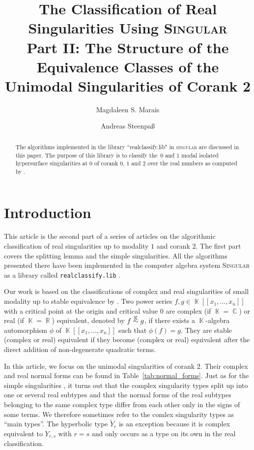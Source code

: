 \documentclass[noend]{amsproc}
\title[The Classification of Real Singularities Using \textsc{Singular}, %
Part II]%
{The Classification of Real Singularities Using \textsc{Singular}\\
Part II: The Structure of the Equivalence Classes of the Unimodal %
Singularities of Corank 2}
\author{Magdaleen S. Marais}
\author{Andreas Steenpa\ss}
\theoremstyle{definition}
\newcommand{\Singular}{\textsc{Singular}}
\newcommand{\realclassify}{\texttt{realclassify.lib}}
\newcommand{\tY}{\widetilde{Y}}
\DeclareMathOperator{\R}{\mathbb{R}}
\DeclareMathOperator{\C}{\mathbb{C}}
\DeclareMathOperator{\K}{\mathbb{K}}
\newcommand{\ksim}{\ensuremath{\mathrel{%
  \raisebox{0pt}[\heightof{$\overset{\scriptscriptstyle\K}{\sim}$}]{%
    $\overset{\K}{\sim}$%
  }%
}}}
\begin{document}
\begin{abstract}
The algorithms implemented in the library ``realclassify.lib" in
\textsc{singular} are discussed in this paper. The purpose of this library is
to classify the~$0$ and $1$ modal isolated hypersurface singularities at $0$ of
corank $0$, $1$ and $2$ over the real numbers as computed by \citet{AVG1985}.
\end{abstract}
\maketitle


\section{Introduction}

This article is the second part of a series of articles on the algorithmic
classification of real singularities up to modality $1$ and corank $2$. The
first part \citep{MS2013} covers the splitting lemma and the simple
singularities. All the algorithms presented there have been implemented in the
computer algebra system \Singular{} \citep{DGPS} as a library called
\realclassify{} \citep{realclassify}.

Our work is based on the classifications of complex and real singularities of
small modality up to stable equivalence by \citet{AVG1985}. Two power series
$f, g \in \K[[x_1,\ldots,x_n]]$ with a critical point at the origin and
critical value $0$ are complex (if $\K = \C$) or real (if $\K = \R$)
equivalent, denoted by $f \ksim g$, if there exists a $\K$-algebra automorphism
$\phi$ of $\K[[x_1,\ldots,x_n]]$ such that $\phi(f) = g$. They are stable
(complex or real) equivalent if they become (complex or real) equivalent after
the direct addition of non-degenerate quadratic terms.

In this article, we focus on the unimodal singularities of corank 2. Their
complex and real normal forms can be found in Table~\ref{tab:normal_forms}.
Just as for the simple singularities \citep[cf.][]{MS2013}, it turns out that
the complex singularity types split up into one or several real subtypes and
that the normal forms of the real subtypes belonging to the same complex type
differ from each other only in the signs of some terms. We therefore sometimes
refer to the comlex singularity types as ``main types''. The hyperbolic type
$\tY_r$ is an exception because it is complex equivalent to $Y_{r,s}$ with
$r = s$ and only occurs as a type on its own in the real classification.
\end{document}
